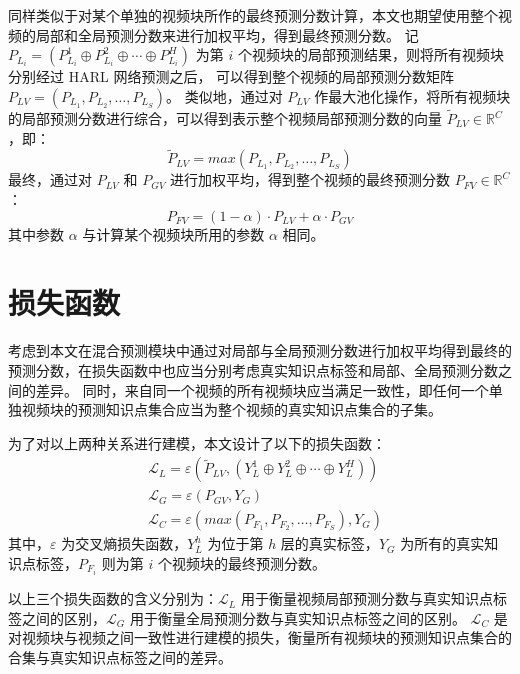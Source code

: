     同样类似于对某个单独的视频块所作的最终预测分数计算，本文也期望使用整个视频的局部和全局预测分数来进行加权平均，得到最终预测分数。
    记 $P_{L_i} = \left(P_{L_i}^1 \oplus P_{L_i}^2 \oplus \cdots \oplus P_{L_i}^H\right)$ 为第 $i$ 个视频块的局部预测结果，则将所有视频块分别经过 HARL 网络预测之后，
    可以得到整个视频的局部预测分数矩阵 $P_{LV} = \left(P_{L_1}, P_{L_2}, \dots, P_{L_S}\right)$。
    类似地，通过对 $P_{LV}$ 作最大池化操作，将所有视频块的局部预测分数进行综合，可以得到表示整个视频局部预测分数的向量 $\tilde{P}_{LV} \in \mathbb{R}^{C}$，即：
    \begin{equation}
        \tilde{P}_{LV} = max\left(P_{L_1}, P_{L_2}, \dots, P_{L_S}\right)
    \end{equation}
    最终，通过对 $P_{LV}$ 和 $P_{GV}$ 进行加权平均，得到整个视频的最终预测分数 $P_{FV} \in \mathbb{R}^{C}$：
    \begin{equation}
        P_{FV} = (1 - \alpha) \cdot P_{LV} + \alpha \cdot P_{GV}
    \end{equation}
    其中参数 $\alpha$ 与计算某个视频块所用的参数 $\alpha$ 相同。


\section{损失函数}
    考虑到本文在混合预测模块中通过对局部与全局预测分数进行加权平均得到最终的预测分数，在损失函数中也应当分别考虑真实知识点标签和局部、全局预测分数之间的差异。
    同时，来自同一个视频的所有视频块应当满足一致性，即任何一个单独视频块的预测知识点集合应当为整个视频的真实知识点集合的子集。

    为了对以上两种关系进行建模，本文设计了以下的损失函数：
    \begin{equation}
        \begin{aligned}
            &\mathcal{L}_L = \varepsilon\left(\tilde{P}_{LV}, \left(Y_L^1 \oplus Y_L^2 \oplus \cdots \oplus Y_L^H\right)\right) \\
            &\mathcal{L}_G = \varepsilon\left(P_{GV}, Y_G\right) \\
            &\mathcal{L}_C = \varepsilon\left(max\left(P_{F_1}, P_{F_2}, \dots, P_{F_S}\right), Y_G\right)
        \end{aligned}
    \end{equation}
    其中，$\varepsilon$ 为交叉熵损失函数，$Y_L^h$ 为位于第 $h$ 层的真实标签，$Y_G$ 为所有的真实知识点标签，$P_{F_i}$ 则为第 $i$ 个视频块的最终预测分数。

    以上三个损失函数的含义分别为：$\mathcal{L}_L$ 用于衡量视频局部预测分数与真实知识点标签之间的区别，$\mathcal{L}_G$ 用于衡量全局预测分数与真实知识点标签之间的区别。
    $\mathcal{L}_C$ 是对视频块与视频之间一致性进行建模的损失，衡量所有视频块的预测知识点集合的合集与真实知识点标签之间的差异。

